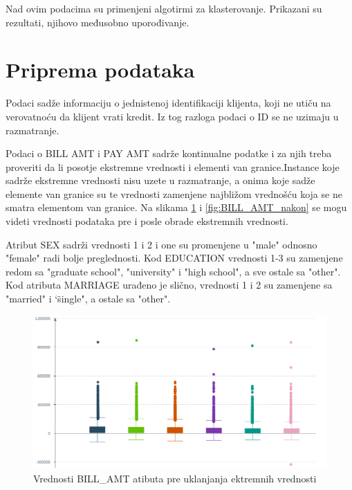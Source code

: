 \documentclass[a4paper]{article}
\begin{document}
Nad ovim podacima su primenjeni algotirmi za klasterovanje. Prikazani su rezultati, njihovo međusobno uporođivanje.

\section{Priprema podataka}
Podaci sadže informaciju o jednistenoj identifikaciji klijenta, koji ne utiču na verovatnoću da klijent vrati kredit. Iz tog razloga podaci o ID se ne uzimaju u razmatranje.

Podaci o BILL AMT i PAY AMT sadrže kontinualne podatke i za njih treba proveriti da li posotje ekstremne vrednosti i elementi van granice.Instance koje sadrže ekstremne vrednosti nisu uzete u razmatranje, a onima koje sadže elemente van granice su te vrednosti zamenjene najbližom vrednošću koja se ne smatra elementom van granice.  Na slikama \ref{fig:BILL_AMT_pre} i \ref{fig:BILL_AMT_nakon} se mogu videti vrednosti podataka pre i posle obrade ekstremnih vrednosti.

Atribut SEX sadrži vrednosti 1 i 2 i one su promenjene u "male" odnosno "female" radi bolje preglednosti. Kod EDUCATION vrednosti 1-3 su zamenjene redom sa "graduate school", "university" i "high school", a sve ostale sa "other". Kod atributa MARRIAGE urađeno je slično, vrednosti 1 i 2 su zamenjene sa "married" i \char`\"single", a ostale sa "other".
\begin{figure}[h!]
\begin{center}
    \includegraphics[scale=0.5]{bill_amt.png}
    \caption{Vrednosti BILL\_AMT atibuta pre uklanjanja ektremnih vrednosti}
    \label{fig:BILL_AMT_pre}
\end{center}
\end{figure}
\end{document}
